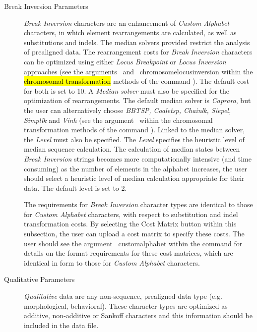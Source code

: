 \begin{description}
	\item [Break Inversion Parameters] \emph{Break Inversion} characters are an enhancement of 				
		\emph{Custom 	Alphabet} characters, in which element rearrangements are calculated, as well as
		 substitutions and indels. The median solvers provided restrict the analysis of prealigned data. 
		 The rearrangement costs for \emph{Break Inversion} characters can be optimized using 
		 either \emph{Locus Breakpoint} or \emph{Locus Inversion} approaches (see the 
		 arguments~ and~
		 {chromosomelocusinversion} within the \hl{chromosomal transformation} methods of the command 
		 ). The default cost for both is set to 10. A \emph{Median solver} must also be 
		 specified for the optimization of rearrangements. The default median solver is \emph{Caprara}, 
		 but the user can alternatively choose \emph{BBTSP, Coaletsp, Chainlk, Siepel, Simpllk} and 
		 \emph{Vinh} (see the argument~ within the 
		 chromosomal transformation methods of the command ). Linked to the 
		 median solver, the \emph{Level} must also be specified. The \emph{Level} specifies the heuristic 
		 level of median sequence calculation. The calculation of median states between 
		 \emph {Break Inversion} strings becomes more computationally intensive (and time consuming) 
		 as the number of elements in the alphabet increases, the user should select a heuristic level 
		 of median calculation appropriate for their data.  The default level is set to 2.
		 

		\indent The requirements for \emph{Break Inversion} character types are identical to those for 
		 \emph{Custom Alphabet} characters, with respect to substitution and indel transformation costs. 
		 By selecting the Cost Matrix button within this subsection, the user can upload a 
		 cost matrix to specify these costs. The user should see the argument~
		 {customalphabet} within the command  for details on the format requirements 
		 for these cost matrices, which are identical in form to those for \emph{Custom Alphabet} characters.
 	
	\item [Qualitative Parameters] \emph{Qualitative} data are any non-sequence, prealigned 
		data type (e.g. morphological, behavioral). These character types are optimized as additive, 
		non-additive or Sankoff characters and this information should be included in the data file.
	\end{description}
	

